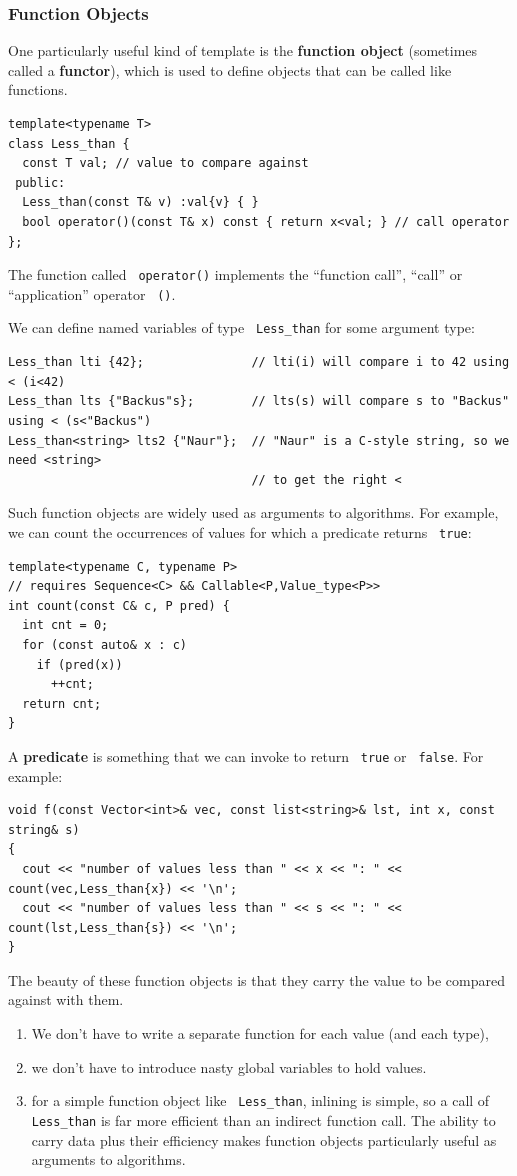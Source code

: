 \documentclass[11pt]{article}
\let\OldTexttt\texttt
\renewcommand{\texttt}[1]{\OldTexttt{\color{MidnightBlue} #1}}
\begin{document}
\subsubsection{Function Objects}
\label{sec:orge587f4d}
One particularly useful kind of template is the \textbf{function object} (sometimes called a \textbf{functor}),
which is used to define objects that can be called like functions.
\begin{verbatim}
template<typename T>
class Less_than {
  const T val; // value to compare against
 public:
  Less_than(const T& v) :val{v} { }
  bool operator()(const T& x) const { return x<val; } // call operator
};
\end{verbatim}
The function called \texttt{operator()} implements the ``function call'', ``call'' or ``application'' operator
\texttt{()}.

We can define named variables of type \texttt{Less\_than} for some argument type:
\begin{verbatim}
Less_than lti {42};               // lti(i) will compare i to 42 using < (i<42)
Less_than lts {"Backus"s};        // lts(s) will compare s to "Backus" using < (s<"Backus")
Less_than<string> lts2 {"Naur"};  // "Naur" is a C-style string, so we need <string>
                                  // to get the right <
\end{verbatim}

Such function objects are widely used as arguments to algorithms. For example, we can count the
occurrences of values for which a predicate returns \texttt{true}:
\begin{verbatim}
template<typename C, typename P>
// requires Sequence<C> && Callable<P,Value_type<P>>
int count(const C& c, P pred) {
  int cnt = 0;
  for (const auto& x : c)
    if (pred(x))
      ++cnt;
  return cnt;
}
\end{verbatim}

A \textbf{predicate} is something that we can invoke to return \texttt{true} or \texttt{false}. For example:
\begin{verbatim}
void f(const Vector<int>& vec, const list<string>& lst, int x, const string& s)
{
  cout << "number of values less than " << x << ": " << count(vec,Less_than{x}) << '\n';
  cout << "number of values less than " << s << ": " << count(lst,Less_than{s}) << '\n';
}
\end{verbatim}

The beauty of these function objects is that they carry the value to be compared against with
them.
\begin{enumerate}
\item We don't have to write a separate function for each value (and each type),
\item we don’t have to introduce nasty global variables to hold values.
\item for a simple function object like \texttt{Less\_than}, inlining is simple, so a call of \texttt{Less\_than} is
far more efficient than an indirect function call. The ability to carry data plus their
efficiency makes function objects particularly useful as arguments to algorithms.
\end{enumerate}
\end{document}
